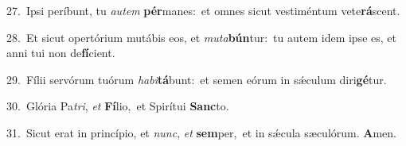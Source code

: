 {\numbfont\textcolor{\numbcolor}{27.}}~Ipsi períbunt, tu \textit{au}\-\textit{tem} \textbf{pér}\-manes:~\star et omnes sicut vestiméntum vete\-\textbf{rá}\-scent.\par
{\numbfont\textcolor{\numbcolor}{28.}}~Et sicut opertórium mutábis eos, et \textit{mu}\-\textit{ta}\textbf{bún}tur:~\star tu autem idem ipse es, et anni tui non de\-\textbf{fí}\-cient.\par
{\numbfont\textcolor{\numbcolor}{29.}}~Fílii servórum tuórum \textit{ha}\-\textit{bi}\textbf{tá}bunt:~\star et semen eórum in sǽculum diri\-\textbf{gé}\-tur.\par
{\numbfont\textcolor{\numbcolor}{30.}}~Glória Pa\-\textit{tri}\-, \textit{et} \textbf{Fí}\-lio,~\star et Spirítui \textbf{Sanc}\-to.\par
{\numbfont\textcolor{\numbcolor}{31.}}~Sicut erat in princípio, et \textit{nunc}\-, \textit{et} \textbf{sem}\-per,~\star et in sǽcula sæculórum. \textbf{A}\-men.\par
